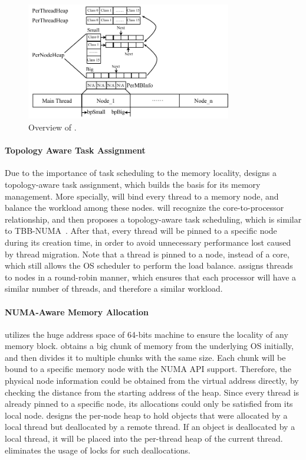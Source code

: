 \begin{figure}[h]
\begin{center}
\includegraphics[width=0.8\textwidth]{figure/heaplayout}
\end{center}
\vspace{-0.1in}
\caption{Overview of \NA{}.
\label{fig:overview}}
\vspace{-0.1in}
\end{figure}

\paragraph{Topology Aware Task Assignment} Due to the importance of task scheduling to the memory locality, \NA{} designs a topology-aware task assignment, which builds the basis for its memory management. More specially, \NA{} will bind every thread to a  memory node, and balance the workload among these nodes. \NA{} will recognize the core-to-processor relationship, and then proposes a topology-aware task scheduling, which is similar to TBB-NUMA~\cite{Majo:2015:LPC:2688500.2688509}.  After that, every thread will be pinned to a specific node during its creation time, in order to avoid unnecessary performance lost caused by thread migration. Note that a thread is pinned to a node, instead of a core, which still allows the OS scheduler to perform the load balance. \NA{} assigns threads to nodes in a round-robin manner, which ensures that each processor will have a similar number of threads, and therefore a similar workload. 

\paragraph{NUMA-Aware Memory Allocation} \NA{} utilizes the huge address space of 64-bits machine to ensure the locality of any memory block. \NA{} obtains a big chunk of memory from the underlying OS initially, and then divides it to multiple chunks with the same size. Each chunk will be bound to a specific memory node with the NUMA API support. Therefore, the physical node information could be obtained from the virtual address directly, by checking the distance from the starting address of the heap. Since every thread is already pinned to a specific node, its allocations could only be satisfied from  its local node. \NA{} designs the per-node heap to hold objects that were allocated by a local thread but deallocated by a remote thread. If an object is deallocated by a local thread, it will be placed into the per-thread heap of the current thread. \NA{} eliminates the usage of locks for such deallocations.      

